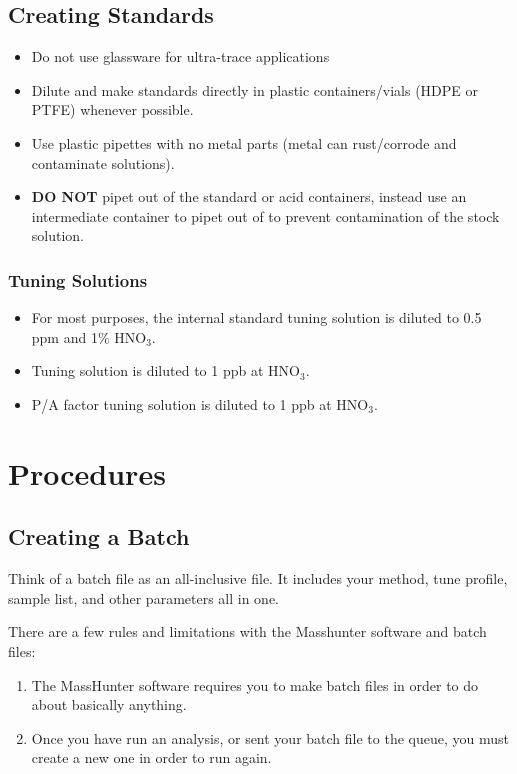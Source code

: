 \documentclass[12pt]{../SOP4_alpha}\usepackage[]{graphicx}\usepackage[]{color}
\begin{document}
\subsection{Creating Standards}

\begin{itemize}
  \item Do not use glassware for ultra-trace applications
  \item Dilute and make standards directly in plastic containers/vials (HDPE or PTFE) whenever possible.
  \item Use plastic pipettes with no metal parts (metal can rust/corrode and contaminate solutions).
  \item \textbf{DO NOT} pipet out of the standard or acid containers, instead use an intermediate container to pipet out of to prevent contamination of the stock solution.
\end{itemize}

\subsubsection{Tuning Solutions}

\begin{itemize}
  \item For most purposes, the internal standard tuning solution is diluted to 0.5 ppm and 1\% HNO$_3$.
  \item Tuning solution is diluted to 1 ppb at HNO$_3$.
  \item P/A factor tuning solution is diluted to 1 ppb at HNO$_3$.
\end{itemize}

\section{Procedures}

\subsection{Creating a Batch}

\NP Think of a batch file as an all-inclusive file. It includes your method, tune profile, sample list, and other parameters all in one.

\NP There are a few rules and limitations with the Masshunter software and batch files:

\begin{enumerate}
\item The MassHunter software requires you to make batch files in order to do about basically anything.
\item Once you have run an analysis, or sent your batch file to the queue, you must create a new one in order to run again.
\end{enumerate}
\end{document}
